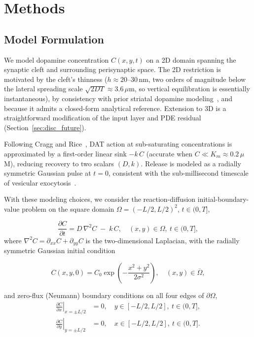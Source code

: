 \documentclass[pdflatex,sn-basic,Numbered]{sn-jnl}
\theoremstyle{thmstyleone}
\theoremstyle{thmstyletwo}
\begin{document}
\section{Methods}
\label{sec:methods}

\subsection{Model Formulation}
\label{sec:math}

We model dopamine concentration $C(x,y,t)$ on a 2D domain
spanning the synaptic cleft and surrounding perisynaptic space.
The 2D restriction is motivated by the cleft's thinness
($h \approx 20$--$30\,\text{nm}$, two orders of magnitude below
the lateral spreading scale $\sqrt{2DT} \approx 3.6\,\mu\text{m}$,
so vertical equilibration is essentially instantaneous), by
consistency with prior striatal dopamine
modeling~\cite{Wiencke2020}, and because it admits a closed-form
analytical reference. Extension to 3D is a
straightforward modification of the input layer and PDE residual
(Section~\ref{sec:disc_future}).

Following Cragg and Rice~\cite{CraggRice2004}, DAT action at
sub-saturating concentrations is approximated by a first-order
linear sink $-k\,C$ (accurate when $C \ll K_m \approx 0.2\,\mu$M),
reducing recovery to two scalars $(D,k)$. Release is modeled as a
radially symmetric Gaussian pulse at $t=0$, consistent with the
sub-millisecond timescale of vesicular
exocytosis~\cite{Wiencke2020}.

With these modeling choices, we consider the reaction-diffusion
initial-boundary-value problem on the square domain
$\Omega = (-L/2, L/2)^2$, $t \in (0, T]$,

\begin{equation}
  \frac{\partial C}{\partial t} = D\,\nabla^2 C \;-\; k\,C,
  \quad (x, y) \in \Omega,\ t \in (0, T],
  \label{eq:pde}
\end{equation}
where $\nabla^2 C = \partial_{xx} C + \partial_{yy} C$ is the
two-dimensional Laplacian, with the radially symmetric Gaussian
initial condition

\begin{equation}
  C(x, y, 0) = C_0 \exp\!\left( -\frac{x^2 + y^2}{2\sigma^2} \right),
  \quad (x, y) \in \overline{\Omega},
  \label{eq:ic}
\end{equation}

and zero-flux (Neumann) boundary conditions on all four edges
of $\partial \Omega$,
\begin{align}
  \left.\frac{\partial C}{\partial x}\right|_{x=\pm L/2}
    &= 0, \quad y \in [-L/2, L/2],\ t \in (0, T],
    \label{eq:bc_left} \\
  \left.\frac{\partial C}{\partial y}\right|_{y=\pm L/2}
    &= 0, \quad x \in [-L/2, L/2],\ t \in (0, T].
    \label{eq:bc_right}
\end{align}
\end{document}
